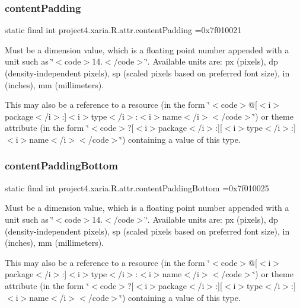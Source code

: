 \subsubsection{\texorpdfstring{content\+Padding}{contentPadding}}
{\footnotesize\ttfamily static final int project4.\+xaria.\+R.\+attr.\+content\+Padding =0x7f010021\hspace{0.3cm}{\ttfamily [static]}}

Must be a dimension value, which is a floating point number appended with a unit such as \char`\"{}$<$code$>$14.\+5sp$<$/code$>$\char`\"{}. Available units are\+: px (pixels), dp (density-\/independent pixels), sp (scaled pixels based on preferred font size), in (inches), mm (millimeters). 

This may also be a reference to a resource (in the form \char`\"{}$<$code$>$@\mbox{[}$<$i$>$package$<$/i$>$\+:\mbox{]}$<$i$>$type$<$/i$>$\+:$<$i$>$name$<$/i$>$$<$/code$>$\char`\"{}) or theme attribute (in the form \char`\"{}$<$code$>$?\mbox{[}$<$i$>$package$<$/i$>$\+:\mbox{]}\mbox{[}$<$i$>$type$<$/i$>$\+:\mbox{]}$<$i$>$name$<$/i$>$$<$/code$>$\char`\"{}) containing a value of this type. \mbox{\label{classproject4_1_1xaria_1_1R_1_1attr_a1b56a7fc87774351e61c9aaedd2953ba}} 
\subsubsection{\texorpdfstring{content\+Padding\+Bottom}{contentPaddingBottom}}
{\footnotesize\ttfamily static final int project4.\+xaria.\+R.\+attr.\+content\+Padding\+Bottom =0x7f010025\hspace{0.3cm}{\ttfamily [static]}}

Must be a dimension value, which is a floating point number appended with a unit such as \char`\"{}$<$code$>$14.\+5sp$<$/code$>$\char`\"{}. Available units are\+: px (pixels), dp (density-\/independent pixels), sp (scaled pixels based on preferred font size), in (inches), mm (millimeters). 

This may also be a reference to a resource (in the form \char`\"{}$<$code$>$@\mbox{[}$<$i$>$package$<$/i$>$\+:\mbox{]}$<$i$>$type$<$/i$>$\+:$<$i$>$name$<$/i$>$$<$/code$>$\char`\"{}) or theme attribute (in the form \char`\"{}$<$code$>$?\mbox{[}$<$i$>$package$<$/i$>$\+:\mbox{]}\mbox{[}$<$i$>$type$<$/i$>$\+:\mbox{]}$<$i$>$name$<$/i$>$$<$/code$>$\char`\"{}) containing a value of this type. \mbox{\label{classproject4_1_1xaria_1_1R_1_1attr_a4f19514e714fbb1e4c39201785a8b9c6}} 
